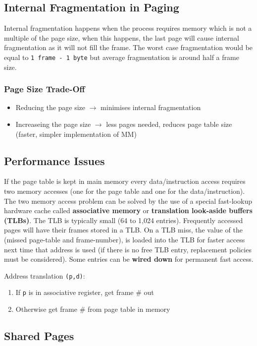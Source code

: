 \documentclass[11pt]{article}
\begin{document}
\subsection{Internal Fragmentation in Paging}
\label{sec:org56d6de9}
Internal fragmentation happens when the process requires memory which is not a multiple of the page size, when this happens, the last page will cause internal fragmentation as it will not fill the frame.
The worst case fragmentation would be equal to \texttt{1 frame - 1 byte} but average fragmentation is around half a frame size.
\subsubsection{Page Size Trade-Off}
\label{sec:org4708429}
\begin{itemize}
\item Reducing the page size \(\rightarrow\) minimises internal fragmentation
\item Increaseing the page size \(\rightarrow\) less pages needed, reduces page table size (faster, simpler implementation of MM)
\end{itemize}
\subsection{Performance Issues}
\label{sec:org893b5ec}
If the page table is kept in main memory every data/instruction access requires two memory accesses (one for the page table and one for the data/instruction).
The two memory access problem can be solved by the use of a special fast-lookup hardware cache called \textbf{associative memory} or \textbf{translation look-aside buffers (TLBs)}.
The TLB is typically small (64 to 1,024 entries).
Frequently accessed pages will have their frames stored in a TLB.
On a TLB miss, the value of the (missed page-table and frame-number), is loaded into the TLB for faster access next time that address is used (if there is no free TLB entry, replacement policies must be considered).
Some entries can be \textbf{wired down} for permanent fast access.

Address translation \texttt{(p,d)}:
\begin{enumerate}
\item If \texttt{p} is in associative register, get frame \# out
\item Otherwise get frame \# from page table in memory
\end{enumerate}
\subsection{Shared Pages}
\label{sec:org078b0a6}
\end{document}
